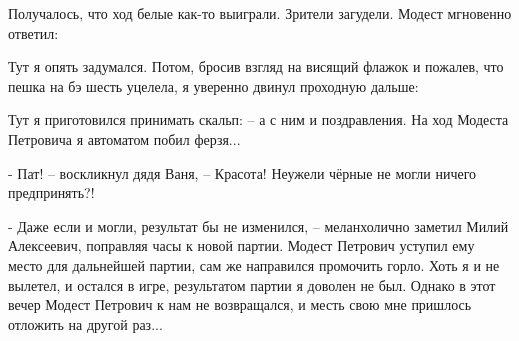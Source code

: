 \begin{multicols}{2}[]

\begin{center}
\begin{diagram}%
\end{diagram}%
\end{center}

Получалось, что ход белые как-то выиграли. Зрители загудели. Модест мгновенно ответил:


Тут я опять задумался. Потом, бросив взгляд на висящий флажок и пожалев, что пешка на бэ шесть уцелела, я уверенно двинул проходную дальше: 


\begin{center}
\begin{diagram}%
\end{diagram}%
\end{center}

Тут я приготовился принимать скальп:  -- а с ним и поздравления. На ход Модеста Петровича я автоматом побил ферзя... 


 - Пат! -- воскликнул дядя Ваня, -- Красота! Неужели чёрные не могли ничего предпринять?! 

\begin{center}
\begin{diagram}%
\end{diagram}%
\end{center}

 - Даже если и могли, результат бы не изменился, -- меланхолично заметил Милий Алексеевич, поправляя часы к новой партии. Модест Петрович уступил ему место для дальнейшей партии, сам же направился промочить горло. Хоть я и не вылетел, и остался в игре, результатом партии я доволен не был. Однако в этот вечер Модест Петрович к нам не возвращался, и месть свою мне пришлось отложить на другой раз...
 \end{multicols}